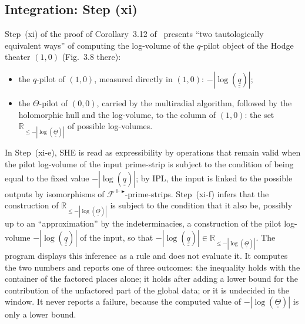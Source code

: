 \documentclass[11pt,a4paper]{article}
\newcommand{\qq}{\underline{\underline{q}}{}}
\newcommand{\Th}{\underline{\underline{\Theta}}{}}
\newcommand{\R}{\mathbb{R}}
\begin{document}
\subsection{Integration: Step (xi)}\label{sec:xi}
Step~(xi) of the proof of Corollary~3.12 of~\cite{IUT3} presents ``two tautologically equivalent ways'' of
computing the log-volume of the $q$-pilot object of the Hodge theater $(1,0)$ (Fig.~3.8 there):
\begin{itemize}
\item[A.] the $q$-pilot of $(1,0)$, measured directly in $(1,0)$: $-|\log(\qq)|$;
\item[B.] the $\Theta$-pilot of $(0,0)$, carried by the multiradial algorithm, followed by the holomorphic hull
  and the log-volume, to the column of $(1,0)$: the set $\R_{\le-|\log(\Th)|}$ of possible log-volumes.
\end{itemize}
In Step~(xi-e), SHE is read as expressibility by operations that remain valid when the pilot log-volume of the
input prime-strip is subject to the condition of being equal to the fixed value $-|\log(\qq)|$; by IPL, the input
is linked to the possible outputs by isomorphisms of $\mathcal{F}^{\Vdash\blacktriangleright}$-prime-strips. Step~(xi-f)
infers that the construction of $\R_{\le-|\log(\Th)|}$ is subject to the condition that it also be, possibly up
to an ``approximation'' by the indeterminacies, a construction of the pilot log-volume $-|\log(\qq)|$ of the input,
so that $-|\log(\qq)|\in\R_{\le-|\log(\Th)|}$. The program displays this inference as a rule and does not
evaluate it. It computes the two numbers and reports one of three outcomes: the inequality holds with the
container of the factored places alone; it holds after adding a lower bound for the contribution of the
unfactored part of the global data; or it is undecided in the window. It never reports a failure, because the
computed value of $-|\log(\Th)|$ is only a lower bound.
\end{document}
